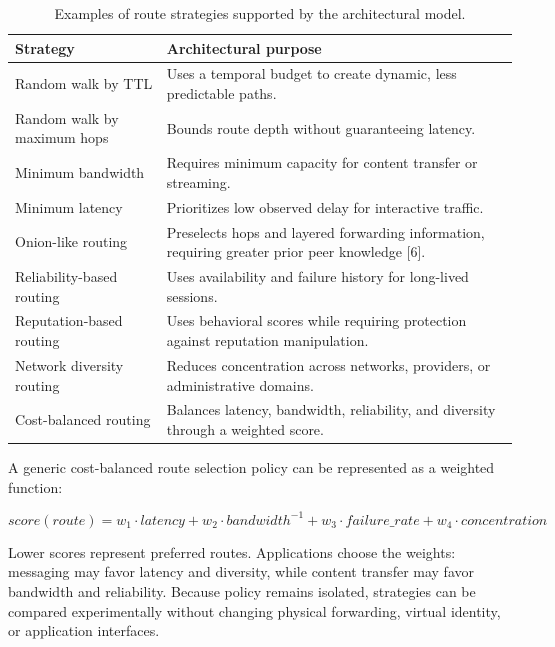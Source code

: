 \documentclass[12pt,a4paper]{article}
\begin{document}
\begin{table}[H]
\centering
\caption{Examples of route strategies supported by the architectural model.}
\label{tab:route-strategy-abstraction}
\small
\begin{tabularx}{\textwidth}{L{0.25\textwidth} Y}
\toprule
\textbf{Strategy} & \textbf{Architectural purpose} \\
\midrule

Random walk by TTL &
Uses a temporal budget to create dynamic, less predictable paths. \\

Random walk by maximum hops &
Bounds route depth without guaranteeing latency. \\

Minimum bandwidth &
Requires minimum capacity for content transfer or streaming. \\

Minimum latency &
Prioritizes low observed delay for interactive traffic. \\

Onion-like routing &
Preselects hops and layered forwarding information, requiring greater prior peer knowledge [6]. \\

Reliability-based routing &
Uses availability and failure history for long-lived sessions. \\

Reputation-based routing &
Uses behavioral scores while requiring protection against reputation manipulation. \\

Network diversity routing &
Reduces concentration across networks, providers, or administrative domains. \\

Cost-balanced routing &
Balances latency, bandwidth, reliability, and diversity through a weighted score. \\

\bottomrule
\end{tabularx}
\end{table}

A generic cost-balanced route selection policy can be represented as a weighted
function:

\[
score(route) =
w_1 \cdot latency +
w_2 \cdot bandwidth^{-1} +
w_3 \cdot failure\_rate +
w_4 \cdot concentration
\]

Lower scores represent preferred routes. Applications choose the weights: messaging may favor latency and diversity, while content transfer may favor bandwidth and reliability. Because policy remains isolated, strategies can be compared experimentally without changing physical forwarding, virtual identity, or application interfaces.
\end{document}
